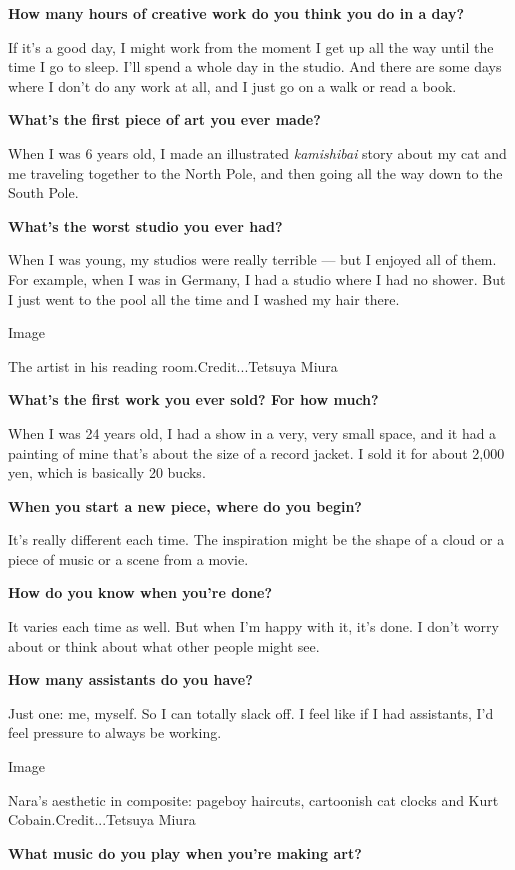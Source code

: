 \textbf{How many hours of creative work do you think you do in a day?}

If it's a good day, I might work from the moment I get up all the way
until the time I go to sleep. I'll spend a whole day in the studio. And
there are some days where I don't do any work at all, and I just go on a
walk or read a book.

\textbf{What's the first piece of art you ever made?}

When I was 6 years old, I made an illustrated \emph{kamishibai} story
about my cat and me traveling together to the North Pole, and then going
all the way down to the South Pole.

\textbf{What's the worst studio you ever had?}

When I was young, my studios were really terrible --- but I enjoyed all
of them. For example, when I was in Germany, I had a studio where I had
no shower. But I just went to the pool all the time and I washed my hair
there.

Image

The artist in his reading room.Credit...Tetsuya Miura

\textbf{What's the first work you ever sold? For how much?}

When I was 24 years old, I had a show in a very, very small space, and
it had a painting of mine that's about the size of a record jacket. I
sold it for about 2,000 yen, which is basically 20 bucks.

\textbf{When you start a new piece, where do you begin?}

It's really different each time. The inspiration might be the shape of a
cloud or a piece of music or a scene from a movie.

\textbf{How do you know when you're done?}

It varies each time as well. But when I'm happy with it, it's done. I
don't worry about or think about what other people might see.

\textbf{How many assistants do you have?}

Just one: me, myself. So I can totally slack off. I feel like if I had
assistants, I'd feel pressure to always be working.

Image

Nara's aesthetic in composite: pageboy haircuts, cartoonish cat clocks
and Kurt Cobain.Credit...Tetsuya Miura

\textbf{What music do you play when you're making art?}


